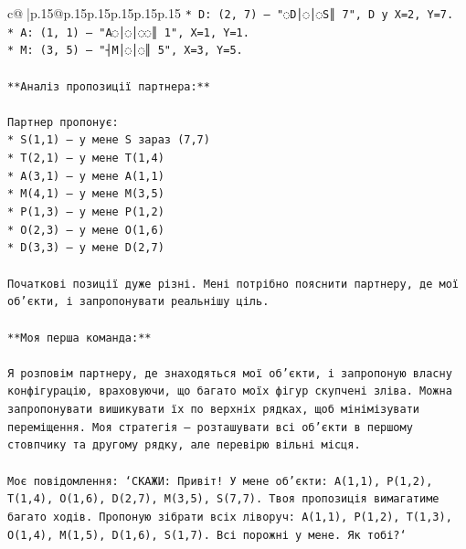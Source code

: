 \documentclass{article}
\begin{document}
{\begin{supertabular}{c@{$\;$}|p{.15\linewidth}@{}p{.15\linewidth}p{.15\linewidth}p{.15\linewidth}p{.15\linewidth}p{.15\linewidth}}
{{{\texttt{* D: (2, 7) – "◌D│◌│◌S║ 7", D у X=2, Y=7.} \\
\texttt{* A: (1, 1) – "A◌│◌│◌◌║ 1", X=1, Y=1.} \\
\texttt{* M: (3, 5) – "┤M│◌│◌║ 5", X=3, Y=5.} \\
\\ 
\texttt{**Аналіз пропозиції партнера:**} \\
\\ 
\texttt{Партнер пропонує:} \\
\texttt{* S(1,1) – у мене S зараз (7,7)} \\
\texttt{* T(2,1) – у мене T(1,4)} \\
\texttt{* A(3,1) – у мене A(1,1)} \\
\texttt{* M(4,1) – у мене M(3,5)} \\
\texttt{* P(1,3) – у мене P(1,2)} \\
\texttt{* O(2,3) – у мене O(1,6)} \\
\texttt{* D(3,3) – у мене D(2,7)} \\
\\ 
\texttt{Початкові позиції дуже різні. Мені потрібно пояснити партнеру, де мої об'єкти, і запропонувати реальнішу ціль.} \\
\\ 
\texttt{**Моя перша команда:**} \\
\\ 
\texttt{Я розповім партнеру, де знаходяться мої об'єкти, і запропоную власну конфігурацію, враховуючи, що багато моїх фігур скупчені зліва. Можна запропонувати вишикувати їх по верхніх рядках, щоб мінімізувати переміщення. Моя стратегія — розташувати всі об'єкти в першому стовпчику та другому рядку, але перевірю вільні місця.} \\
\\ 
\texttt{Моє повідомлення: `СКАЖИ: Привіт! У мене об'єкти: A(1,1), P(1,2), T(1,4), O(1,6), D(2,7), M(3,5), S(7,7). Твоя пропозиція вимагатиме багато ходів. Пропоную зібрати всіх ліворуч: A(1,1), P(1,2), T(1,3), O(1,4), M(1,5), D(1,6), S(1,7). Всі порожні у мене. Як тобі?`} \\
            }
        }
    }
     \\ \\


\end{supertabular}}
\end{document}
